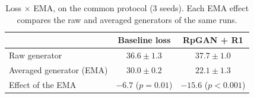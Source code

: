 \begin{table}[t]
\centering
\small
\setlength{\tabcolsep}{6pt}
\caption{Loss $\times$ EMA, \finc{} on the common protocol (3 seeds). Each EMA effect compares the raw and averaged generators of the same runs.}
\label{tab:loss-ema}
\begin{tabular}{lcc}
\toprule
 & Baseline loss & RpGAN + R1\\
\midrule
Raw generator & $36.6\pm1.3$ & $37.7\pm1.0$\\
Averaged generator (EMA) & $30.0\pm0.2$ & $\mathbf{22.1\pm1.3}$\\
\midrule
Effect of the EMA & $-6.7$ ($p=0.01$) & $-15.6$ ($p<0.001$)\\
\bottomrule
\end{tabular}
\end{table}
